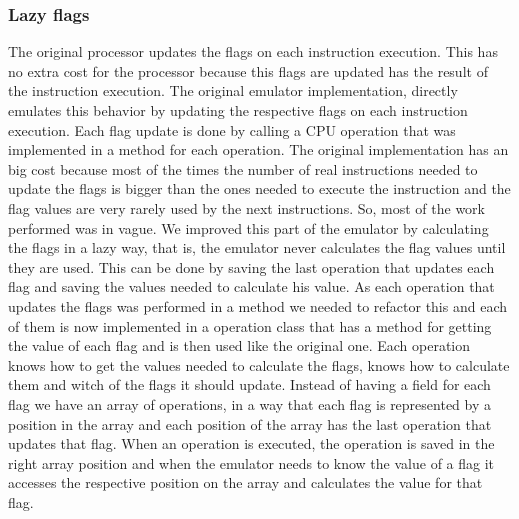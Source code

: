 \subsubsection{Lazy flags}
The original processor updates the flags on each instruction execution. This has no extra cost for the processor because this flags are updated has the result of the instruction execution. The original emulator implementation, directly emulates this behavior by updating the respective flags on each instruction execution. Each flag update is done by calling a CPU operation that was implemented in a method for each operation.
The original implementation has an big cost because most of the times the number of real instructions needed to update the flags is bigger than the ones needed to execute the instruction and the flag values are very rarely used by the next instructions. So, most of the work performed was in vague.
We improved this part of the emulator by calculating the flags in a lazy way, that is, the emulator never calculates the flag values until they are used. This can be done by saving the last operation that updates each flag and saving the values needed to calculate his value.
As each operation that updates the flags was performed in a method we needed to refactor this and each of them is now implemented in a operation class that has a method for getting the value of each flag and is then used like the original one. Each operation knows how to get the values needed to calculate the flags, knows how to calculate them and witch of the flags it should update.
Instead of having a field for each flag we have an array of operations, in a way that each flag is represented by a position in the array and each position of the array has the last operation that updates that flag. When an operation is executed, the operation is saved in the right array position and when the emulator needs to know the value of a flag it accesses the respective position on the array and calculates the value for that flag.

